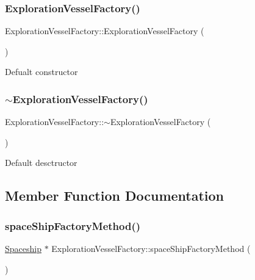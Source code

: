 \subsubsection{\texorpdfstring{Exploration\+Vessel\+Factory()}{ExplorationVesselFactory()}}
{\footnotesize\ttfamily Exploration\+Vessel\+Factory\+::\+Exploration\+Vessel\+Factory (\begin{DoxyParamCaption}{ }\end{DoxyParamCaption})}

Defualt constructor \mbox{\label{classExplorationVesselFactory_a52d1a2adb9d442c82a253de5d68e7b08}} 
\subsubsection{\texorpdfstring{$\sim$\+Exploration\+Vessel\+Factory()}{~ExplorationVesselFactory()}}
{\footnotesize\ttfamily Exploration\+Vessel\+Factory\+::$\sim$\+Exploration\+Vessel\+Factory (\begin{DoxyParamCaption}{ }\end{DoxyParamCaption})}

Default desctructor 

\subsection{Member Function Documentation}
\mbox{\label{classExplorationVesselFactory_a3a139abf87097903138688d662700a65}} 
\subsubsection{\texorpdfstring{space\+Ship\+Factory\+Method()}{spaceShipFactoryMethod()}}
{\footnotesize\ttfamily \hyperlink{classSpaceship}{Spaceship} $\ast$ Exploration\+Vessel\+Factory\+::space\+Ship\+Factory\+Method (\begin{DoxyParamCaption}{ }\end{DoxyParamCaption})\hspace{0.3cm}{\ttfamily [virtual]}}

